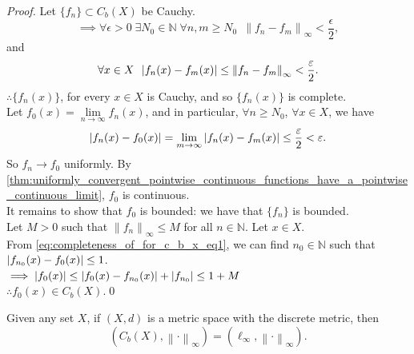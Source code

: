 \documentclass[notoc,notitlepage]{tufte-book}
\newcommand{\norm}[1]{\left\| #1 \right\|}
\begin{document}
\begin{proof}
  Let $\{ f_n \} \subset C_b(X)$ be Cauchy.
  \begin{equation}\tag{$*$}\label{eq:completeness_of_for_c_b_x_eq1}
    \implies \forall \epsilon > 0 \; \exists N_0 \in \mathbb{N} \; \forall n, m \geq N_0 \enspace \norm{ f_n - f_m }_\infty < \frac{\epsilon}{2},
  \end{equation}
  and
  \begin{equation*}
    \forall x \in X \enspace \abs{ f_n(x) - f_m(x) } \leq \norm{ f_n - f_m }_\infty < \frac{\epsilon}{2}.
  \end{equation*}
  $\therefore \{ f_n(x) \}$, for every $x \in X$ is Cauchy, and so $\{ f_n (x) \}$ is complete. \\
  Let $f_0(x) = \lim\limits_{n \to \infty} f_n(x)$, and in particular, $\forall n \geq N_0$, $\forall x \in X$, we have
  \begin{equation*}
    \left| f_n(x) - f_0(x) \right| = \lim_{m \to \infty} \left| f_n(x) - f_m(x) \right| \leq \frac{\varepsilon}{2} < \varepsilon.
  \end{equation*}
  So $f_n \to f_0$ uniformly. By \cref{thm:uniformly_convergent_pointwise_continuous_functions_have_a_pointwise_continuous_limit}, $f_0$ is continuous. \\
  It remains to show that $f_0$ is bounded: we have that $\{ f_n \}$ is bounded. \\
  Let $M > 0$ such that $\norm{ f_n }_\infty \leq M$ for all $n \in \mathbb{N}$. Let $x \in X$. \\
  From \eqref{eq:completeness_of_for_c_b_x_eq1}, we can find $n_0 \in \mathbb{N}$ such that $\left| f_{n_0}(x) - f_0(x) \right| \leq 1$. \\
  $\implies \left| f_0(x) \right| \leq \left| f_0(x) - f_{n_0}(x) \right| + \left| f_{n_0} \right| \leq 1 + M$ \\
  $\therefore f_0(x) \in C_b(X)$.\qed\
\end{proof}

\begin{note}
  Given any set $X$, if $(X, d)$ is a metric space with the discrete metric, then
  \begin{equation*}
    \left( C_b(X), \norm\cdot_\infty \right) = \left( \ell_\infty, \norm\cdot_\infty \right).
  \end{equation*}
\end{note}


\end{document}
